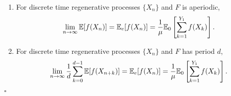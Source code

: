 \documentclass[all-lectures.tex]{subfiles}
\newcommand*{\QEDB}{\hfill\ensuremath{\square}}%
\begin{document}
\begin{thm}\ 
\begin{enumerate}
\item For discrete time regenerative processes $\{X_n\}$ and $F$ is aperiodic,
\begin{align*}
\lim_{n\to \infty} \mathbb{E}[f(X_n)] = \mathbb{E}_e[f(X_n)] = \frac{1}{\mu} \mathbb{E}_0\left[ \sum_{k=1}^{Y_1} f(X_k) \right].
\end{align*}
\item For discrete time regenerative processes $\{X_n\}$ and $F$ has period $d$,
\begin{align*}
\lim_{n\to \infty} \frac{1}{d} \sum_{k=0}^{d-1} \mathbb{E}[f(X_{n+k})] = \mathbb{E}_e[f(X_n)] = \frac{1}{\mu} \mathbb{E}_0\left[ \sum_{k=1}^{Y_1} f(X_k) \right]. 
\end{align*}
\end{enumerate}
\QEDB
\end{thm}

\end{document}
